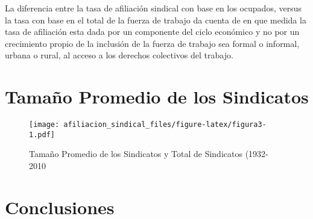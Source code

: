 \documentclass[
]{article}
\begin{document}
La diferencia entre la tasa de afiliación sindical con base en los
ocupados, versus la tasa con base en el total de la fuerza de trabajo da
cuenta de en que medida la tasa de afiliación esta dada por un
componente del ciclo económico y no por un crecimiento propio de la
inclusión de la fuerza de trabajo sea formal o informal, urbana o rural,
al acceso a los derechos colectivos del trabajo.

\hypertarget{tamauxf1o-promedio-de-los-sindicatos}{%
\section{Tamaño Promedio de los
Sindicatos}\label{tamauxf1o-promedio-de-los-sindicatos}}

\begin{figure}
\centering
\texttt{[image: afiliacion\_sindical\_files/figure-latex/figura3-1.pdf]}
\caption{Tamaño Promedio de los Sindicatos y Total de Sindicatos
(1932-2010}
\end{figure}

\hypertarget{conclusiones}{%
\section{Conclusiones}\label{conclusiones}}
\end{document}
